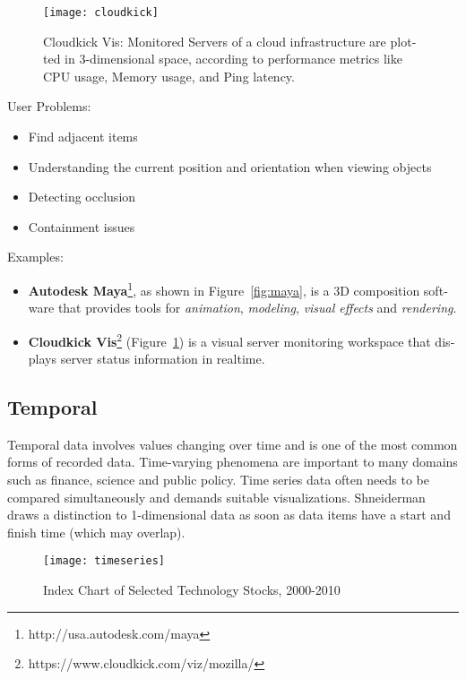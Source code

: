 \begin{english}
\begin{figure}
\centering
\texttt{[image: cloudkick]}
\caption{Cloudkick Vis: Monitored Servers of a cloud infrastructure are plotted in 3-dimensional space, according to performance metrics like CPU usage, Memory usage, and Ping latency.}
\label{fig:cloudkick}
\end{figure}


\SuperPar User Problems:

\begin{itemize}
\item Find adjacent items
\item Understanding the current position and orientation when viewing objects
\item Detecting occlusion
\item Containment issues
\end{itemize}


\SuperPar Examples:

\begin{itemize}
\item \textbf{Autodesk Maya}\footnote{http://usa.autodesk.com/maya}, as shown in Figure~\ref{fig:maya}, is a 3D composition software that provides tools for \emph{animation}, \emph{modeling}, \emph{visual effects} and \emph{rendering}.
\item \textbf{Cloudkick Vis}\footnote{https://www.cloudkick.com/viz/mozilla/} (Figure~\ref{fig:cloudkick}) is a visual server monitoring workspace that displays server status information in realtime.
\end{itemize}


\subsection{Temporal}

Temporal data involves values changing over time and is one of the most common forms of recorded data. Time-varying phenomena are important to many domains such as finance, science and public policy. Time series data often needs to be compared simultaneously and demands suitable visualizations. Shneiderman~\cite{shneiderman96eyes} draws a distinction to 1-dimensional data as soon as data items have a start and finish time (which may overlap).


\begin{figure}
\centering
\texttt{[image: timeseries]}
\caption{Index Chart of Selected Technology Stocks, 2000-2010}
\label{fig:timeseries}
\end{figure}


\end{english}

